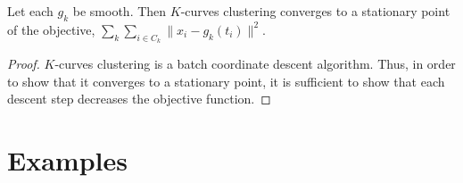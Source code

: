 \documentclass[12pt]{article}
\begin{document}
\begin{theorem}
\label{k-curves-clustering}
Let each $g_k$ be smooth. 
Then $K$-curves clustering converges to a stationary point of the objective, 
$\sum_k \sum_{i \in C_k} \|x_i - g_k(t_i)\|^2$.
\end{theorem}

\begin{proof}
$K$-curves clustering is a batch coordinate descent algorithm. 
Thus, in order to show that it converges to a stationary point, it is sufficient to show that each descent step decreases the objective function. 
\end{proof}

\hypertarget{examples}{%
\section{Examples}\label{examples}}
\end{document}
